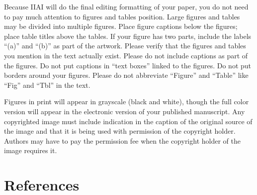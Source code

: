 \documentclass[11pt, onecolumn, twoside, a4paper]{article}
\begin{document}

Because IIAI will do the final editing formatting of your paper, 
you do not need to pay much attention to figures and tables position. 
Large figures and tables may be divided into multiple figures. 
Place figure captions below the figures; place table titles above the tables. 
If your figure has two parts, include the labels ``(a)'' and ``(b)'' as part of the artwork. 
Please verify that the figures and tables you mention in the text actually exist. 
Please do not include captions as part of the figures. 
Do not put captions in ``text boxes'' linked to the figures. 
Do not put borders around your figures. 
Please do not abbreviate ``Figure'' and ``Table'' like ``Fig'' and ``Tbl'' in the text. 

Figures in print will appear in grayscale (black and white), though the full color version will appear in the electronic version of your published manuscript. Any copyrighted image must include indication in the caption of the original source of the image and that it is being used with permission of the copyright holder. Authors may have to pay the permission fee when the copyright holder of the image requires it.




\section{References}
\end{document}
